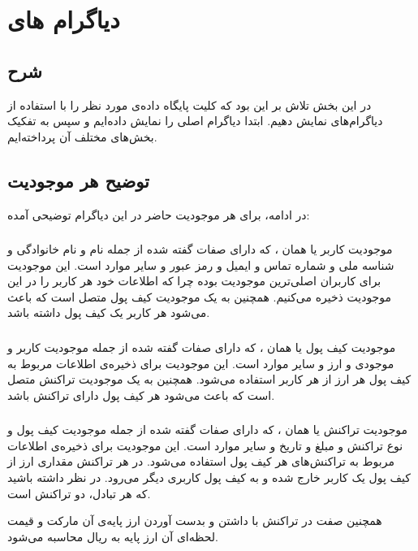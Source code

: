 \documentclass{book}
\begin{document}
\chapter{دیاگرام های }
\section{شرح}
در این بخش تلاش بر این بود که کلیت پایگاه داده‌ی مورد نظر را با استفاده از دیاگرام‌های  نمایش دهیم. ابتدا دیاگرام  اصلی را نمایش داده‌ایم و سپس به تفکیک بخش‌های مختلف آن پرداخته‌ایم.
\section{توضیح هر موجودیت}
در ادامه، برای هر موجودیت حاضر در این دیاگرام توضیحی آمده:

\subsection{}
موجودیت کاربر یا همان ، که دارای صفات گفته شده از جمله نام و نام خانوادگی و شناسه ملی و شماره تماس و ایمیل و رمز عبور و سایر موارد است. این موجودیت برای کاربران اصلی‌ترین موجودیت بوده چرا که اطلاعات خود هر کاربر را در این موجودیت ذخیره می‌کنیم. همچنین به یک موجودیت کیف پول متصل است که باعث می‌شود هر کاربر یک کیف پول داشته باشد.

\subsection{}
موجودیت کیف پول یا همان ، که دارای صفات گفته شده از جمله موجودیت کاربر و موجودی و ارز و سایر موارد است. این موجودیت برای ذخیره‌ی اطلاعات مربوط به کیف پول هر ارز از هر کاربر استفاده می‌شود. همچنین به یک موجودیت تراکنش متصل است که باعث می‌شود هر کیف پول دارای تراکنش باشد.

\subsection{}
موجودیت تراکنش یا همان ، که دارای صفات گفته شده از جمله موجودیت کیف پول و نوع تراکنش و مبلغ و تاریخ و سایر موارد است. این موجودیت برای ذخیره‌ی اطلاعات مربوط به تراکنش‌های هر کیف پول استفاده می‌شود. در هر تراکنش مقداری ارز از کیف پول یک کاربر خارج شده و به کیف پول کاربری دیگر می‌رود. در نظر داشته باشید که هر تبادل، دو تراکنش است.

همچنین صفت  در تراکنش با داشتن  و بدست آوردن ارز پایه‌ی آن مارکت و قیمت لحظه‌ای آن ارز پایه به ریال محاسبه می‌شود.
\end{document}

